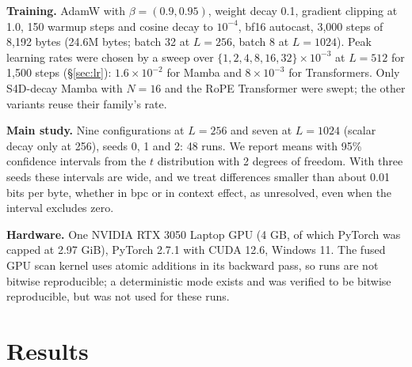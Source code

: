 \documentclass[11pt]{article}
\begin{document}
\textbf{Training.} AdamW \citep{loshchilov2017adamw} with $\beta = (0.9, 0.95)$, weight decay 0.1, gradient clipping at 1.0, 150 warmup steps and cosine decay to $10^{-4}$, bf16 autocast, 3,000 steps of 8,192 bytes (24.6M bytes; batch 32 at $L = 256$, batch 8 at $L = 1024$). Peak learning rates were chosen by a sweep over $\{1,2,4,8,16,32\} \times 10^{-3}$ at $L = 512$ for 1,500 steps (\S\ref{sec:lr}): $1.6\times10^{-2}$ for Mamba and $8\times10^{-3}$ for Transformers. Only S4D-decay Mamba with $N = 16$ and the RoPE Transformer were swept; the other variants reuse their family's rate.

\textbf{Main study.} Nine configurations at $L = 256$ and seven at $L = 1024$ (scalar decay only at 256), seeds 0, 1 and 2: 48 runs. We report means with 95\% confidence intervals from the $t$ distribution with 2 degrees of freedom. With three seeds these intervals are wide, and we treat differences smaller than about 0.01 bits per byte, whether in bpc or in context effect, as unresolved, even when the interval excludes zero.

\textbf{Hardware.} One NVIDIA RTX 3050 Laptop GPU (4 GB, of which PyTorch was capped at 2.97 GiB), PyTorch 2.7.1 with CUDA 12.6, Windows 11. The fused GPU scan kernel uses atomic additions in its backward pass, so runs are not bitwise reproducible; a deterministic mode exists and was verified to be bitwise reproducible, but was not used for these runs.

\section{Results}\label{sec:results}
\end{document}
